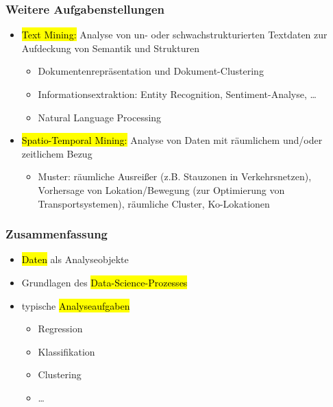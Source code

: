 
\begin{frame}
\frametitle{Weitere Aufgabenstellungen}

\begin{itemize}
\item \hl{Text Mining:} Analyse von un- oder schwachstrukturierten Textdaten zur Aufdeckung von Semantik und Strukturen
\begin{itemize}
\item Dokumentenrepräsentation und Dokument-Clustering
\item Informationsextraktion: Entity Recognition, Sentiment-Analyse, \dots
\item Natural Language Processing
\end{itemize}
\item \hl{Spatio-Temporal Mining:} Analyse von Daten mit räumlichem
  und/oder zeitlichem Bezug
\begin{itemize}
\item Muster: räumliche Ausreißer (z.B. Stauzonen in Verkehrsnetzen),
  Vorhersage von Lokation/Bewegung (zur Optimierung von
  Transportsystemen), räumliche Cluster, Ko-Lokationen
\end{itemize}
\end{itemize}
\end{frame}



\begin{frame}
\frametitle{Zusammenfassung}

\begin{itemize}
\item \hl{Daten} als Analyseobjekte
\item Grundlagen des \hl{Data-Science-Prozesses}
\item typische \hl{Analyseaufgaben}
\begin{itemize}
\item Regression
\item Klassifikation
\item Clustering
\item \dots
\end{itemize}
\end{itemize}

\end{frame}



